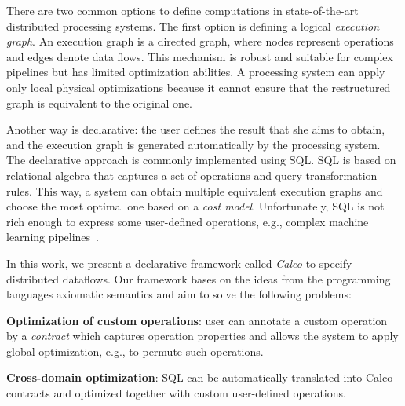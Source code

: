 There are two common options to define computations in state-of-the-art distributed processing systems.
The first option is defining a logical {\em execution graph}.
An execution graph is a directed graph, where nodes represent operations and edges denote data flows.
This mechanism is robust and suitable for complex pipelines but has limited optimization abilities. 
A processing system can apply only local physical optimizations because it cannot ensure that the restructured graph is equivalent to the original one.

Another way is declarative: the user defines the result that she aims to obtain, and the execution graph is generated automatically by the processing system.
The declarative approach is commonly implemented using SQL. 
SQL is based on relational algebra that captures a set of operations and query transformation rules.
This way, a system can obtain multiple equivalent execution graphs and choose the most optimal one based on a {\em cost model}. 
Unfortunately, SQL is not rich enough to express some user-defined operations, e.g., complex machine learning pipelines~\cite{PROOF}.

In this work, we present a declarative framework called {\em Calco} to specify distributed dataflows. Our framework bases on the ideas from the programming languages axiomatic semantics and aim to solve the following problems:

{\bf Optimization of custom operations}: user can annotate a custom operation by a {\em contract} which captures operation properties and allows the system to apply global optimization, e.g., to permute such operations.

{\bf Cross-domain optimization}: SQL can be automatically translated into Calco contracts and optimized together with custom user-defined operations.
